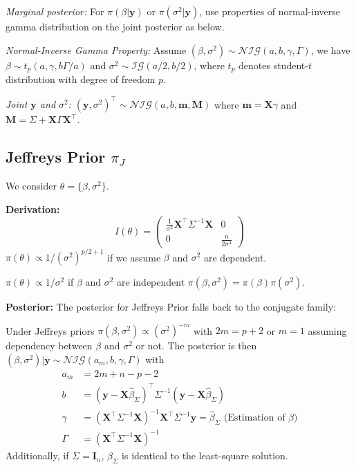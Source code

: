 \documentclass[5pt,a4paper, twocolumn]{article}
\newcommand{\subtopic}[1]{\subsection*{#1}}
\begin{document}
{\emph{Marginal posterior:} For $\pi(\beta \vert \mathbf{y})$ or $\pi(\sigma^2 \vert \mathbf{y})$, use properties of normal-inverse gamma distribution on the joint posterior as below.

\emph{Normal-Inverse Gamma Property:} Assume $(\beta, \sigma^2) \sim \mathcal{NIG}(a, b, \gamma, \Gamma)$, we have $\beta \sim t_p(a, \gamma, b\Gamma/a)$ and $\sigma^2 \sim \mathcal{IG}(a/2, b/2)$, where $t_p$ denotes student-$t$ distribution with degree of freedom $p$.

\emph{Joint $\mathbf{y}$ and $\sigma^2$:} $(\mathbf{y}, \sigma^2)^\top \sim \mathcal{NIG}(a, b, \mathbf{m}, \mathbf{M})$ where $\mathbf{m}=\mathbf{X}\gamma$ and $\mathbf{M}=\Sigma + \mathbf{X}\Gamma\mathbf{X}^\top$.

\subtopic{Jeffreys Prior $\pi_J$}
We consider $\theta=\{\beta, \sigma^2\}$.

\textbf{Derivation:}
\begin{equation*}
I(\theta)=
\begin{pmatrix}
\frac{1}{\sigma^2}\mathbf{X}^\top \Sigma^{-1}\mathbf{X} & 0 \\
0 & \frac{n}{2\sigma^4}
\end{pmatrix}
\end{equation*}
$\pi(\theta) \propto 1/(\sigma^2)^{p/2+1}$ if we assume $\beta$ and $\sigma^2$ are dependent.

$\pi(\theta) \propto 1/\sigma^2$ if $\beta$ and $\sigma^2$ are independent $\pi(\beta, \sigma^2) = \pi(\beta)\pi(\sigma^2)$.

\textbf{Posterior:} The posterior for Jeffreys Prior falls back to the conjugate family:

Under Jeffreys priors $\pi(\beta, \sigma^2) \propto (\sigma^2)^{-m}$  with $2m = p + 2$ or $m = 1$ assuming dependency between $\beta$ and $\sigma^2$ or not. The posterior is then $(\beta, \sigma^2) \vert \mathbf{y} \sim \mathcal{NIG}(a_m, b, \gamma, \Gamma)$ with
\begin{align*}
a_m &= 2m + n - p - 2 \\
b &= (\mathbf{y} - \mathbf{X}\hat{\beta}_{\Sigma})^\top\Sigma^{-1}(\mathbf{y} - \mathbf{X}\hat{\beta}_{\Sigma}) \\
\gamma &= (\mathbf{X}^\top \Sigma^{-1}\mathbf{X})^{-1}\mathbf{X}^\top \Sigma^{-1}\mathbf{y} = \hat{\beta}_{\Sigma} \text{ (Estimation of $\beta$)}\\
\Gamma &= (\mathbf{X}^\top \Sigma^{-1}\mathbf{X})^{-1}
\end{align*}
Additionally, if $\Sigma=\mathbf{I}_n$, $\hat{\beta}_\Sigma$ is identical to the least-square solution.

}
\end{document}
